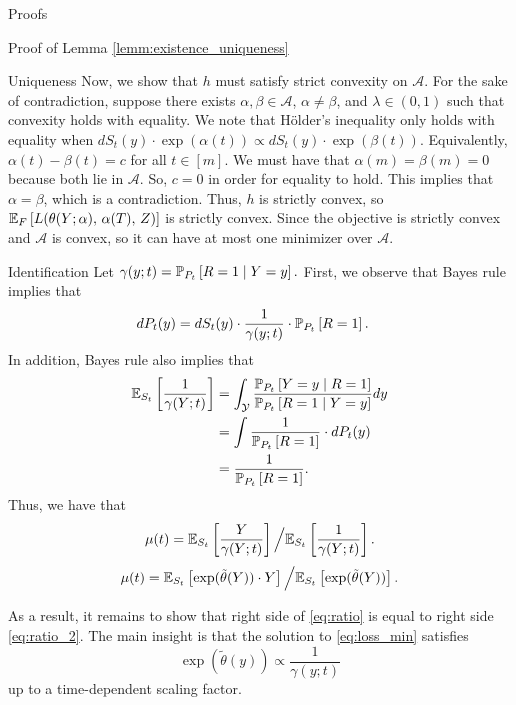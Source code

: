\documentclass{article}
\theoremstyle{definition}
\theoremstyle{plain}
\theoremstyle{remark}
\begin{document}
\begin{section}{Proofs}
\begin{subsection}{Proof of Lemma \ref{lemm:existence_uniqueness}}
\begin{subsubsection}{Uniqueness}
Now, we show that $h$ must satisfy strict convexity on $\mathcal{A}$. For the sake of contradiction, suppose there exists $\alpha, \beta \in \mathcal{A}$, $\alpha \neq \beta$, and $\lambda \in (0, 1)$ such that convexity holds with equality. We note that Hölder's inequality only holds with equality when $dS_{t}(y) \cdot \exp(\alpha(t)) \propto  dS_{t}(y) \cdot \exp(\beta(t))$. Equivalently, $\alpha(t) - \beta(t) = c$ for all $t \in [m]$. We must have that $\alpha(m) = \beta(m) = 0$ because both lie in $\mathcal{A}$. So, $c = 0$ in order for equality to hold. This implies that $\alpha = \beta$, which is a contradiction. Thus, $h$ is strictly convex, so $\EE[F]{L(\theta(Y; \alpha),\, \alpha(T),\, Z)}$ is strictly convex. Since the objective is strictly convex and $\mathcal{A}$ is convex, so it can have at most one minimizer over $\mathcal{A}.$ 



\end{subsubsection}

\begin{subsubsection}{Identification}
Let $\gamma(y;t) = \PP[P_{t}]{R=1 \mid Y=y}.$ First, we observe that Bayes rule implies that 
\begin{align*}
dP_{t}(y) &= dS_{t}(y) \cdot \frac{1}{\gamma(y;t)} \cdot \PP[P_{t}]{R=1}.
\end{align*}
In addition, Bayes rule also implies that
\begin{align*}
\EE[S_{t}]{\frac{1}{\gamma(Y;t)}} &= \int_{\mathcal{Y}} \frac{\PP[P_{t}]{Y=y \mid R=1}}{\PP[P_{t}]{R=1 \mid Y=y}} dy \\
&= \int \frac{1}{\PP[P_{t}]{R=1}} \cdot dP_{t}(y) \\
&= \frac{1}{\PP[P_{t}]{R=1}}.
\end{align*}
Thus, we have that
\begin{equation} \label{eq:ratio} \mu(t) = \EE[S_{t}]{\frac{Y}{\gamma(Y;t)}} \Big/ \EE[S_{t}]{\frac{1}{\gamma(Y;t)}}. \end{equation}
\begin{equation} \label{eq:ratio_2} \mu(t) = \EE[S_{t}]{\exp(\tilde{\theta}(Y)) \cdot Y} \Big/ \EE[S_{t}]{\exp(\tilde{\theta}(Y))}. \end{equation}

As a result, it remains to show that right side of \eqref{eq:ratio} is equal to right side \eqref{eq:ratio_2}. The main insight is that the solution to \eqref{eq:loss_min} satisfies
\begin{equation} \label{eq:prop_density} \exp(\tilde{\theta}(y)) \propto \frac{1}{\gamma(y;t)} \end{equation}
up to a time-dependent scaling factor.


\end{subsubsection}
\end{subsection}
\end{section}
\end{document}
